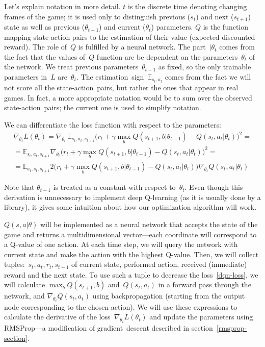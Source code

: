 Let's explain notation in more detail. $t$ is the discrete time denoting changing frames of the game; it is used only to distinguish previous ($s_t$) and next ($s_{t+1}$) state as well as previous ($\theta_{t-1}$) and current ($\theta_t$) parameters. $Q$ is the function mapping state-action pairs to the estimation of their value (expected discounted reward). The role of~$Q$ is fulfilled by a neural network. The part~$|\theta_t$ comes from the fact that the values of~$Q$ function are be dependent on the parameters~$\theta_t$ of the network. We treat previous parameters~$\theta_{t-1}$ as fixed, so the only trainable parameters in~$L$ are~$\theta_t$. The estimation~sign~$\mathbb{E}_{s_t, a_t}$ comes from the fact we will not score all the state-action~pairs, but rather the ones that appear in real games. In fact, a more appropriate notation would be to sum over the observed state-action~pairs; the current one is used to simplify notation.

We can differentiate the loss function with respect to the parameters:
\begin{multline}
  \nabla_{\theta_t} L(\theta_t) = \nabla_{\theta_t}\, \mathbb{E}_{s_t, a_t, s_{t+1}} \big(r_t + \gamma \max_b Q(s_{t+1}, b|\theta_{t-1}) - Q(s_t, a_t|\theta_t)\big)^2
 =\\=
  \mathbb{E}_{s_t, a_t, s_{t+1}} \nabla_{\theta_t} \big(r_t + \gamma \max_b Q(s_{t+1}, b|\theta_{t-1}) - Q(s_t, a_t|\theta_t)\big)^2
  =\\=
  \mathbb{E}_{a_t,s_t, s_{t+1}} 2\Big(
  r_t + \gamma \max_b Q(s_{t+1}, b|\theta_{t-1}) - Q(s_t, a_t|\theta_t)\Big)
  \nabla_{\theta_t} Q(s_t, a_t|\theta_t)
\end{multline}

Note that $\theta_{t-1}$ is treated as a constant with respect to~$\theta_t$. Even though this derivation is unnecessary to implement deep Q-learning (as it is usually done by a library), it gives some intuition about how our optimization algorithm will work.

$Q(s, a|\theta)$ will be implemented as a neural network that accepts the state of the game and returns a multidimensional vector---each coordinate will correspond to a Q-value of one action. At each time step, we will query the network with current state and make the action with the highest Q-value.
Then, we will collect tuples:~$s_t, a_t, r_t, s_{t+1}$ of current state, performed action, received (immediate) reward and the next state. To use such a tuple to decrease the loss~\eqref{dqn-loss}, we will calculate $\max_b Q(s_{t+1}, b)$ and~$Q(s_t, a_t)$ in a forward pass through the network, and $\nabla_{\theta_t} Q(s_t, a_t)$ using backpropagation (starting from the output node corresponding to the chosen action). We will use these expressions to calculate the derivative of the loss~$\nabla_{\theta_t} L(\theta_t)$ and update the parameters using RMSProp---a modification of gradient~descent described in section~\ref{rmsprop-section}.


